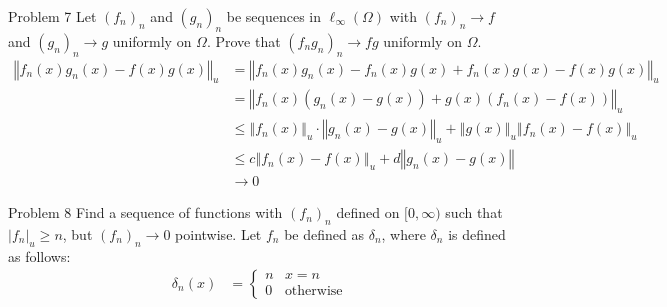 \documentclass[8pt]{extarticle}
\begin{document}
  \begin{problem}{Problem 7}
    Let $(f_n)_n$ and $(g_n)_n$ be sequences in $\ell_{\infty}(\Omega)$ with $(f_n)_n \rightarrow f$ and $(g_n)_n \rightarrow g$ uniformly on $\Omega$. Prove that $(f_ng_n)_n \rightarrow fg$ uniformly on $\Omega$.
    \tcblower
    \begin{align*}
      \left\Vert f_n(x)g_n(x) - f(x)g(x)\right\Vert_u &= \left\Vert f_n(x)g_n(x) - f_n(x)g(x) + f_n(x)g(x) - f(x)g(x)\right\Vert_u\\
                                                      &= \left\Vert f_n(x)\left(g_n(x) - g(x)\right) + g(x)\left(f_n(x)-f(x)\right)\right\Vert_u\\
                                                      &\leq \left\Vert f_n(x)\right\Vert_u \cdot \left\Vert g_n(x) - g(x)\right\Vert_u + \left\Vert g(x)\right\Vert_u\left\Vert f_n(x) - f(x)\right\Vert_u \tag*{Triangle Inequality}\\
                                                      &\leq c\left\Vert f_n(x) - f(x)\right\Vert_u + d\left\Vert g_n(x) - g(x)\right\Vert \tag*{Definition of Supremum}\\
                                                      &\rightarrow 0
    \end{align*}
  \end{problem}
  \begin{problem}{Problem 8}
    Find a sequence of functions with $(f_n)_n$ defined on $[0,\infty)$ such that $\left|f_n\right|_u \geq n$, but $(f_n)_n \rightarrow 0$ pointwise.
    \tcblower
    Let $f_n$ be defined as $\delta_n$, where $\delta_n$ is defined as follows:
    \begin{align*}
      \delta_n(x) &= \begin{cases}
        n & x=n\\
        0 & \text{otherwise}
      \end{cases}
    \end{align*}
  \end{problem}
\end{document}
